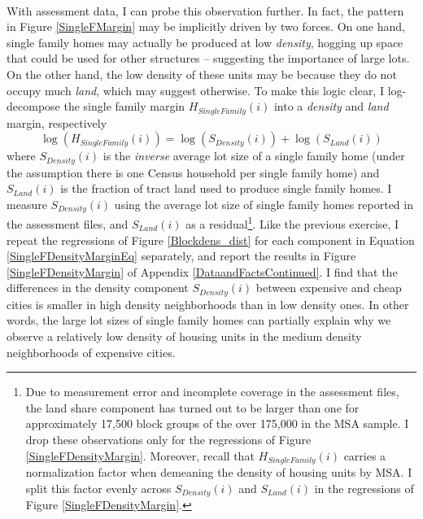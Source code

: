 \documentclass[]{article}
\begin{document}
\paragraph*{}
With assessment data, I can probe this observation further. In fact, the pattern in Figure \ref{SingleFMargin} may be implicitly driven by two forces. On one hand, single family homes may actually be produced at low \textit{density}, hogging up space that could be used for other structures -- suggesting the importance of large lots. On the other hand, the low density of these units may be because they do not occupy much \textit{land}, which may suggest otherwise. To make this logic clear, I log-decompose the single family margin $H_{SingleFamily}(i)$ into a \textit{density} and \textit{land} margin, respectively
\begin{equation}\label{SingleFDensityMarginEq}
	\log(H_{SingleFamily}(i)) = \log(S_{Density}(i)) + \log(S_{Land}(i))  
\end{equation}
where $S_{Density}(i)$ is the \textit{inverse} average lot size of a single family home (under the assumption there is one Census household per single family home) and $S_{Land}(i)$ is the fraction of tract land used to produce single family homes. I measure $S_{Density}(i)$ using the average lot size of single family homes reported in the assessment files, and $S_{Land}(i)$ as a residual\footnote{Due to measurement error and incomplete coverage in the assessment files, the land share component has turned out to be larger than one for approximately 17,500 block groups of the over 175,000 in the MSA sample. I drop these observations only for the regressions of Figure \ref{SingleFDensityMargin}. Moreover, recall that $H_{SingleFamily}(i)$ carries a normalization factor when demeaning the density of housing units by MSA. I split this factor evenly across $S_{Density}(i)$ and $S_{Land}(i)$ in the regressions of Figure \ref{SingleFDensityMargin}.}. Like the previous exercise, I repeat the regressions of Figure \ref{Blockdens_dist} for each component in Equation \eqref{SingleFDensityMarginEq} separately, and report the results in Figure \ref{SingleFDensityMargin} of Appendix \ref{DataandFactsContinued}. I find that the differences in the density component $S_{Density}(i)$ between expensive and cheap cities is smaller in high density neighborhoods than in low density ones. In other words, the large lot sizes of single family homes can partially explain why we observe a relatively low density of housing units in the medium density neighborhoods of expensive cities.
\end{document}
